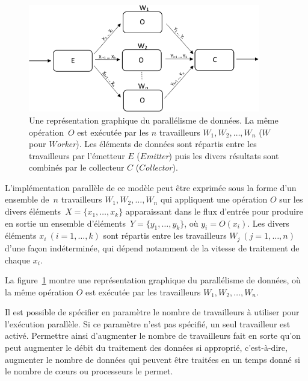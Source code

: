 \begin{figure}

\centering
     \includegraphics[width=0.9\textwidth]{Figures/DataParallelisme.png}
      \caption[Une repr\'esentation graphique du parall\'elisme de donn\'ees en \ppff.]{Une repr\'esentation graphique du parall\'elisme de donn\'ees. La m\^eme op\'eration~$O$ est ex\'ecut\'ee par les $n$ travailleurs $W_1, W_2,\ldots, W_n$ ($W$ pour \emph{$W$orker}). Les \'el\'ements de donn\'ees sont r\'epartis entre les travailleurs par l'\'emetteur $E$ ($E$\emph{mitter}) puis les divers r\'esultats sont combin\'es par le collecteur $C$ ($C$\emph{ollector}).}
       \label{DataParallelisme.fig}
\end{figure}


L'impl\'ementation parall\`ele de ce mod\`ele peut \^etre
exprim\'ee sous la forme d'un ensemble de~$n$ travailleurs $W_1, W_2,\ldots, W_n$ qui
appliquent une op\'eration $O$ sur les divers \'el\'ements~$X = \{x_1, \ldots, x_k\}$ apparaissant dans
le flux d'entr\'ee pour produire en sortie un ensemble d'\'el\'ements~$Y = \{y_1, \ldots, y_k\}$, o\`u $y_i = O(x_i)$.
%
Les divers \'el\'ements $x_i~(i=1, \ldots, k)$ sont r\'epartis entre
les travailleurs $W_j~(j=1, \ldots, n)$ d'une fa\c{c}on
ind\'etermin\'ee, qui d\'epend notamment de la vitesse de traitement
de chaque $x_i$.
%

La figure~\ref{DataParallelisme.fig} montre une repr\'esentation graphique du parall\'elisme de donn\'ees, o\`u la m\^eme op\'eration $O$ est ex\'ecut\'ee par les travailleurs $W_1, W_2,\ldots, W_n$. 

Il est possible de sp\'ecifier en param\`etre le nombre de travailleurs \`a utiliser pour l'ex\'ecution parall\`ele. Si ce param\`etre n'est pas sp\'ecifi\'e, un seul travailleur est activ\'e. Permettre ainsi d'augmenter le nombre de travailleurs fait en sorte qu'on peut augmenter le d\'ebit du traitement des donn\'ees si appropri\'e, c'est-\`a-dire, augmenter le nombre de donn\'ees qui peuvent \^etre trait\'ees en un temps donn\'e si le nombre de c\oe{}urs ou processeurs le permet.




